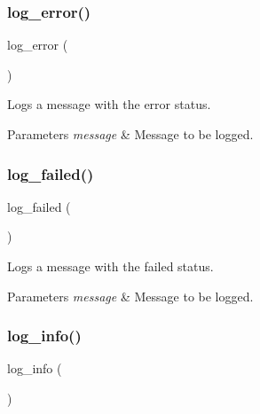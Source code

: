 \subsubsection{\texorpdfstring{log\+\_\+error()}{log\_error()}}
{\footnotesize\ttfamily log\+\_\+error (\begin{DoxyParamCaption}\item[{message}]{ }\end{DoxyParamCaption})}



Logs a message with the \textquotesingle{}error\textquotesingle{} status. 


\begin{DoxyParams}{Parameters}
{\em message} & Message to be logged. \\
\hline
\end{DoxyParams}
\mbox{\label{group__log_ga0cb03f40aca4c3da6097aa2578c828ad}} 
\subsubsection{\texorpdfstring{log\+\_\+failed()}{log\_failed()}}
{\footnotesize\ttfamily log\+\_\+failed (\begin{DoxyParamCaption}\item[{message}]{ }\end{DoxyParamCaption})}



Logs a message with the \textquotesingle{}failed\textquotesingle{} status. 


\begin{DoxyParams}{Parameters}
{\em message} & Message to be logged. \\
\hline
\end{DoxyParams}
\mbox{\label{group__log_ga92ca4a8206896c4a61c287683582defa}} 
\subsubsection{\texorpdfstring{log\+\_\+info()}{log\_info()}}
{\footnotesize\ttfamily log\+\_\+info (\begin{DoxyParamCaption}\item[{message}]{ }\end{DoxyParamCaption})}



